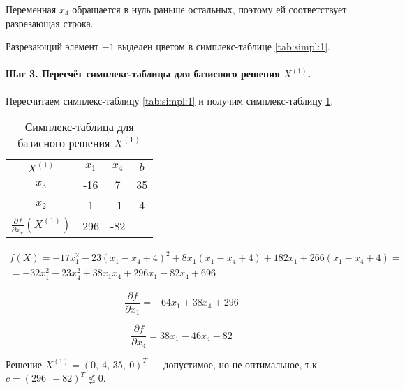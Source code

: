 Переменная $x_4$ обращается в нуль раньше остальных, поэтому ей соответствует разрезающая строка.

Разрезающий элемент $-1$ выделен цветом в симплекс-таблице \ref{tab:simpl:1}. 

\paragraph{Шаг 3. Пересчёт симплекс-таблицы для базисного решения $X^{(1)}$.}

Пересчитаем симплекс-таблицу \ref{tab:simpl:1} и получим симплекс-таблицу \ref{tab:simpl:2}.

\begin{table}[H]
\begin{center}
	\caption{Симплекс-таблица для базисного решения $X^{(1)}$}
	\label{tab:simpl:2}
	\def\tabcolsep{18pt}
	\def\arraystretch{1.5}
	\fontsize{13}{14}\selectfont
	\begin{tabular}{|c||c||c|c|}
		\hline 
		$X^{(1)}$ & $x_1$ & $x_4$ & $b$ \\ 
		\hhline{|=#=#=|=|} 
		$x_3$ & \cellcolor{pink} -16 & 7 & 35 \\ 
		\hhline{|=#=#=|=|}
		$x_2$ & 1 & -1 & 4 \\ 
		\hline
		$\frac{\partial f}{\partial x_r} \left(X^{(1)} \right)$ & 296 & -82 &  \\ 
		\hline 
	\end{tabular} 
\end{center}
\end{table}

\begin{equation*}
\begin{aligned}
	f(X) = -17 x_1^2 - 23 (x_1 - x_4 + 4)^2 + 8 x_1 (x_1 - x_4 + 4) + 182 x_1 + 266 (x_1 - x_4 + 4) = \\ = -32 x_1^2 - 23 x_4^2 + 38 x_1 x_4 +296 x_1 - 82 x_4 + 696
\end{aligned}
\end{equation*}

\begin{equation*}
	\frac{\partial f}{\partial x_1} = -64 x_1 + 38 x_4 + 296
\end{equation*}

\begin{equation*}
	\frac{\partial f}{\partial x_4} = 38 x_1 -46 x_4 -82
\end{equation*}

Решение $X^{(1)} = (0,\ 4,\, 35,\ 0)^T$ --- допустимое, но не оптимальное, т.к. $c = (296\ \ -82)^T \nleq 0$.

